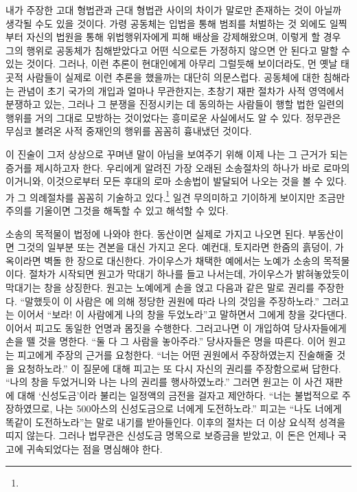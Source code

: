 내가 주장한 고대 형법관과 근대 형법관 사이의 차이가
말로만 존재하는 것이 아닐까 생각될 수도 있을 것이다.
가령 공동체는
입법을 통해 범죄를 처벌하는 것 외에도
일찍부터
자신의 법원을 통해
위법행위자에게 피해 배상을
강제해왔으며,
이렇게 할 경우
그의 행위로 공동체가 침해받았다고
어떤 식으로든
가정하지 않으면 안 된다고
말할 수 있는 것이다.
그러나,
이런 추론이
현대인에게
아무리 그럴듯해 보이더라도,
먼 옛날 태곳적 사람들이
실제로
이런 추론을
했을까는 대단히 의문스럽다.
공동체에 대한 침해라는 관념이
초기 국가의 개입과
얼마나 무관한지는,
초창기 재판 절차가
사적 영역에서 분쟁하고 있는,
그러나 그 분쟁을 진정시키는 데 동의하는
사람들이 행할 법한
일련의 행위를 거의 그대로 모방하는 것이었다는
흥미로운 사실에서도
알 수 있다.
정무관은 무심코 불려온 사적 중재인의 행위를 꼼꼼히 흉내냈던 것이다.

이 진술이 그저 상상으로 꾸며낸 말이 아님을 보여주기 위해
이제 나는 그 근거가 되는 증거를 제시하고자 한다.
우리에게 알려진 가장 오래된 소송절차의 하나가
바로 로마의
이거니와,
이것으로부터 모든 후대의 로마 소송법이 발달되어 나오는 것을 볼 수 있다.
가 그 의례절차를 꼼꼼히 기술하고 있다.\footnote{%
   }
일견 무의미하고 기이하게 보이지만
조금만 주의를 기울이면 그것을 해독할 수 있고 해석할 수 있다.

소송의 목적물이 법정에 나와야 한다.
동산이면 실제로 가지고 나오면 된다.
부동산이면 그것의 일부분 또는 견본을 대신 가지고 온다.
예컨대, 토지라면 한줌의 흙덩이, 가옥이라면 벽돌 한 장으로 대신한다.
가이우스가 채택한 예에서는 노예가 소송의 목적물이다.
절차가 시작되면 원고가 막대기 하나를 들고 나서는데,
가이우스가 밝혀놓았듯이 막대기는 창을 상징한다.
원고는 노예에게 손을 얹고 다음과 같은 말로 권리를 주장한다.
``말했듯이
이 사람은 에 의해 정당한 권원에 따라 나의 것임을
주장하노라.''
그러고는 이어서 ``보라! 이 사람에게 나의 창을
두었노라''고 말하면서
그에게 창을 갖다댄다.
이어서 피고도 동일한 언명과 몸짓을 수행한다.
그러고나면 이 개입하여
당사자들에게 손을 뗄 것을 명한다.
``둘 다 그 사람을 놓아주라.''
당사자들은 명을 따른다.
이어 원고는 피고에게 주장의 근거를 요청한다.
``너는 어떤 권원에서 주장하였는지 진술해줄 것을
요청하노라.''
이 질문에 대해 피고는 또 다시 자신의 권리를 주장함으로써 답한다.
``나의 창을 두었거니와 나는 나의 권리를 행사하였노라.''
그러면 원고는 이 사건 재판에 대해
`신성도금'이라 불리는 일정액의 금전을 걸자고 제안하다.
``너는 불법적으로 주장하였므로,
나는 500아스의 신성도금으로 너에게
도전하노라.''
피고는 ``나도 너에게 똑같이 도전하노라''는 말로
내기를 받아들인다.
이후의 절차는 더 이상 요식적 성격을 띠지 않는다.
그러나 법무관은 신성도금 명목으로 보증금을 받았고,
이 돈은 언제나 국고에 귀속되었다는 점을 명심해야 한다.


